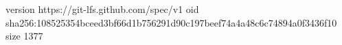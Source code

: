 version https://git-lfs.github.com/spec/v1
oid sha256:108525354bceed3bf66d1b756291d90c197beef74a4a48c6c74894a0f3436f10
size 1377
